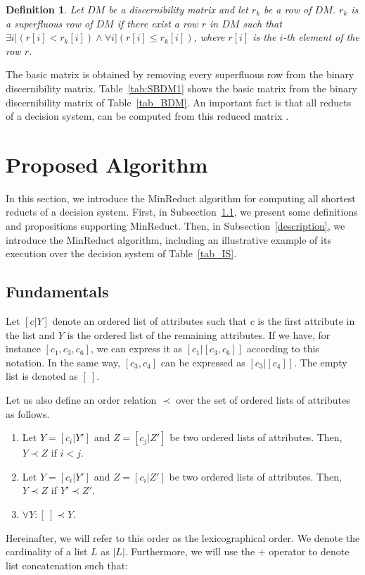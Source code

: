 \documentclass[authoryear,preprint,review,12pt]{elsarticle}
\newtheorem{definition}{Definition}
\begin{document}
  \begin{definition}\label{def:basic_row}
	Let $DM$ be a discernibility matrix and let $r_k$ be a row of $DM$. $r_k$ is a superfluous row of $DM$ if there exist a row $r$ in $DM$ such that $\exists i | (r[i] < r_k[i]) \wedge \forall i | (r[i] \leq r_k[i])$, where $r[i]$ is the $i$-th element of the row $r$.
  \end{definition}

  The basic matrix is obtained by removing every superfluous row from the binary discernibility matrix. Table~\ref{tab:SBDM1} shows the basic matrix from the binary discernibility matrix of Table~\ref{tab_BDM}. An important fact is that all reducts of a decision system, can be computed from this reduced matrix \citep{Yao09}.
  
\section{Proposed Algorithm}\label{MinReduct}
  In this section, we introduce the MinReduct algorithm for computing all shortest reducts of a decision system. First, in Subsection~\ref{properties}, we present some definitions and propositions supporting MinReduct. Then, in Subsection~\ref{description}, we introduce the MinReduct algorithm, including an illustrative example of its execution over the decision system of Table~\ref{tab_IS}.
  
\subsection{Fundamentals}\label{properties}
	
	Let $[c|Y]$ denote an ordered list of attributes such that $c$ is the first attribute in the list and $Y$ is the ordered list of the remaining attributes. If we have, for instance $[c_1,c_3,c_6]$, we can express it as $[c_1|[c_3,c_6]]$ according to this notation. In the same way, $[c_3,c_4]$ can be expressed as $[c_3|[c_4]]$. The empty list is denoted as $[~]$.
	
	Let us also define an order relation $\prec$ over the set of ordered lists of attributes as follows.
	\begin{enumerate}
		\item Let $Y=[c_i|Y']$ and $Z=[c_j|Z']$ be two ordered lists of attributes. Then, $Y \prec Z$ if $i<j$.
		\item Let $Y=[c_i|Y']$ and $Z=[c_i|Z']$ be two ordered lists of attributes. Then, $Y \prec Z$ if $Y' \prec Z'$.
		\item $\forall Y:  [~] \prec Y$.
	\end{enumerate}
	Hereinafter, we will refer to this order as the lexicographical order. We denote the cardinality of a list $L$ as $|L|$. Furthermore, we will use the $+$ operator to denote list concatenation such that: 
	
\end{document}
